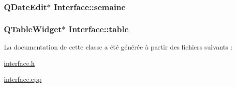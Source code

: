 \subsubsection[{semaine}]{\setlength{\rightskip}{0pt plus 5cm}Q\+Date\+Edit$\ast$ Interface\+::semaine\hspace{0.3cm}{\ttfamily [private]}}\label{class_interface_ac4ca6cf95990077c3c695f54b9340d46}
\hypertarget{class_interface_add370ece6c97151da99ebab84362c6a1}{}
\subsubsection[{table}]{\setlength{\rightskip}{0pt plus 5cm}Q\+Table\+Widget$\ast$ Interface\+::table\hspace{0.3cm}{\ttfamily [private]}}\label{class_interface_add370ece6c97151da99ebab84362c6a1}


La documentation de cette classe a été générée à partir des fichiers suivants \+:\begin{DoxyCompactItemize}
\item 
\hyperlink{interface_8h}{interface.\+h}\item 
\hyperlink{interface_8cpp}{interface.\+cpp}\end{DoxyCompactItemize}

